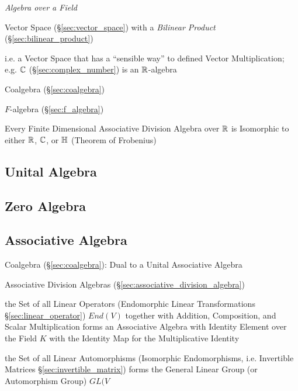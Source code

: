 \emph{Algebra over a Field}

Vector Space (\S\ref{sec:vector_space}) with a \emph{Bilinear Product}
(\S\ref{sec:bilinear_product})

i.e. a Vector Space that has a ``sensible way'' to defined Vector
Multiplication; e.g. $\mathbb{C}$ (\S\ref{sec:complex_number}) is an
$\mathbb{R}$-algebra

Coalgebra (\S\ref{sec:coalgebra})

$F$-algebra (\S\ref{sec:f_algebra})

Every Finite Dimensional Associative Division Algebra over $\mathbb{R}$ is
Isomorphic to either $\mathbb{R}$, $\mathbb{C}$, or $\mathbb{H}$ (Theorem of
Frobenius) %



\subsection{Unital Algebra}\label{sec:unital_algebra}

\subsection{Zero Algebra}\label{sec:zero_algebra}

\subsection{Associative Algebra}\label{sec:associative_algebra}

Coalgebra (\S\ref{sec:coalgebra}): Dual to a Unital Associative
Algebra

\fist Associative Division Algebras (\S\ref{sec:associative_division_algebra})

the Set of all Linear Operators (Endomorphic Linear Transformations
\S\ref{sec:linear_operator}) $End(V)$ together with Addition, Composition, and
Scalar Multiplication forms an Associative Algebra with Identity Element over
the Field $K$ with the Identity Map for the Multiplicative Identity

\fist the Set of all Linear Automorphisms (Isomorphic Endomorphisms, i.e.
Invertible Matrices \S\ref{sec:invertible_matrix}) forms the General Linear
Group (or Automorphism Group) $GL(V$

